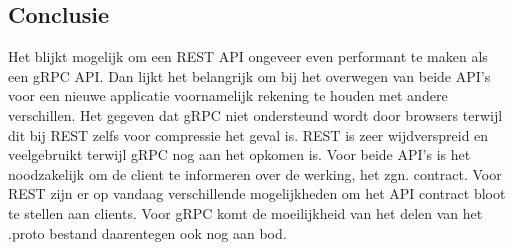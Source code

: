 \documentclass[a0,portrait]{hogent-poster}
\begin{document}
\begin{multicols}{2}
\section{Conclusie}
Het blijkt mogelijk om een REST API ongeveer even performant te maken als een gRPC API. Dan lijkt het belangrijk om bij het overwegen van beide API's voor een nieuwe applicatie
voornamelijk rekening te houden met andere verschillen. Het gegeven dat gRPC niet ondersteund wordt door browsers terwijl dit bij REST zelfs voor compressie het geval is.
REST is zeer wijdverspreid en veelgebruikt terwijl gRPC nog aan het opkomen is.
Voor beide API's is het noodzakelijk om de client te informeren over de werking, het zgn. contract.
Voor REST zijn er op vandaag verschillende mogelijkheden om het API contract bloot te stellen aan clients.
Voor gRPC komt de moeilijkheid van het delen van het .proto bestand daarentegen ook nog aan bod.

\end{multicols}
\end{document}
